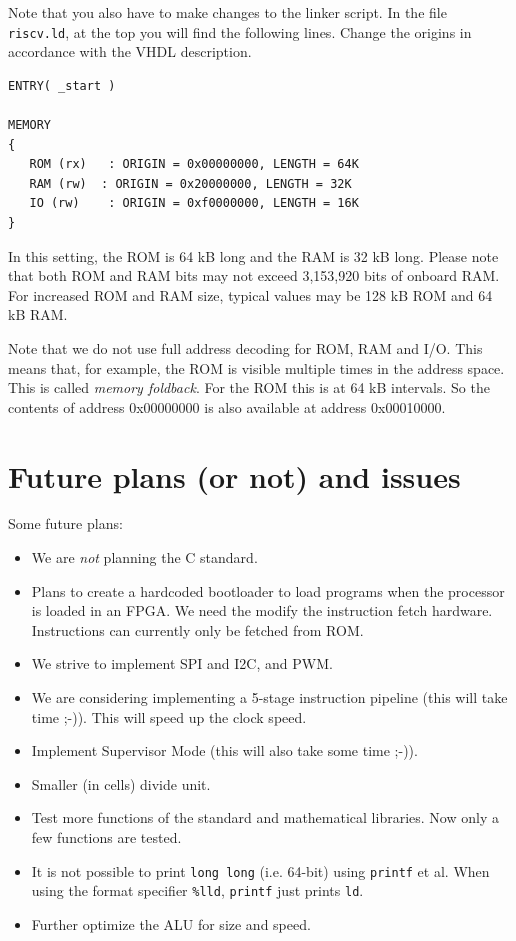 \documentclass[12pt]{article}
\begin{document}
Note that you also have to make changes to the linker script. In the file \texttt{riscv.ld}, at the top you will find the following lines. Change the origins in accordance with the VHDL description.

\begin{lstlisting}
ENTRY( _start )

MEMORY
{
   ROM (rx)   : ORIGIN = 0x00000000, LENGTH = 64K
   RAM (rw)  : ORIGIN = 0x20000000, LENGTH = 32K
   IO (rw)    : ORIGIN = 0xf0000000, LENGTH = 16K
}
\end{lstlisting}

In this setting, the ROM is 64 kB long and the RAM is 32 kB long. Please note that both ROM and RAM bits may not exceed 3,153,920 bits of onboard RAM. For increased ROM and RAM size, typical values may be 128 kB ROM and 64 kB RAM.

Note that we do not use full address decoding for ROM, RAM and I/O. This means that, for example, the ROM is visible multiple times in the address space. This is called \emph{memory foldback}. For the ROM this is at 64 kB intervals. So the contents of address 0x00000000 is also available at address 0x00010000.

\section{Future plans (or not) and issues}
Some future plans:

\begin{itemize}
\item We are \emph{not} planning the C standard.
\item Plans to create a hardcoded bootloader to load programs when the processor is loaded in an FPGA. We need the modify the instruction fetch hardware. Instructions can currently only be fetched from ROM.
\item We strive to implement SPI and I2C, and PWM.
\item We are considering implementing a 5-stage instruction pipeline (this will take time ;-)). This will speed up the clock speed.
\item Implement Supervisor Mode (this will also take some time ;-)).
\item Smaller (in cells) divide unit.
\item Test more functions of the standard and mathematical libraries. Now only a few functions are tested.
\item It is not possible to print \texttt{long long} (i.e. 64-bit) using \texttt{printf} et al. When using the format specifier \texttt{\%lld}, \texttt{printf} just prints \texttt{ld}.
\item Further optimize the ALU for size and speed.
\end{itemize}
\end{document}
